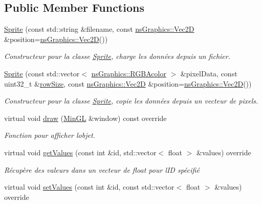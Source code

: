 \subsection*{Public Member Functions}
\begin{DoxyCompactItemize}
\item 
\hyperlink{classns_gui_1_1_sprite_a35558b08dfeb3e3a20be52da28e33c4c}{Sprite} (const std\+::string \&filename, const \hyperlink{classns_graphics_1_1_vec2_d}{ns\+Graphics\+::\+Vec2D} \&position=\hyperlink{classns_graphics_1_1_vec2_d}{ns\+Graphics\+::\+Vec2D}())
\begin{DoxyCompactList}\small\item\em Constructeur pour la classe \hyperlink{classns_gui_1_1_sprite}{Sprite}, charge les données depuis un fichier. \end{DoxyCompactList}\item 
\hyperlink{classns_gui_1_1_sprite_abee8e5a2740555d46f19af3d4b489453}{Sprite} (const std\+::vector$<$ \hyperlink{classns_graphics_1_1_r_g_b_acolor}{ns\+Graphics\+::\+R\+G\+B\+Acolor} $>$ \&pixel\+Data, const uint32\+\_\+t \&\hyperlink{sprite_8h_a410460a0a75462ae38c5c9daf5fb06ed}{row\+Size}, const \hyperlink{classns_graphics_1_1_vec2_d}{ns\+Graphics\+::\+Vec2D} \&position=\hyperlink{classns_graphics_1_1_vec2_d}{ns\+Graphics\+::\+Vec2D}())
\begin{DoxyCompactList}\small\item\em Constructeur pour la classe \hyperlink{classns_gui_1_1_sprite}{Sprite}, copie les données depuis un vecteur de pixels. \end{DoxyCompactList}\item 
virtual void \hyperlink{classns_gui_1_1_sprite_a15157c69a1d792080d2b41519659418c}{draw} (\hyperlink{class_min_g_l}{Min\+GL} \&window) const override
\begin{DoxyCompactList}\small\item\em Fonction pour afficher l\textquotesingle{}objet. \end{DoxyCompactList}\item 
virtual void \hyperlink{classns_gui_1_1_sprite_a19cd382e454660efd8a20ee30ba3cc8c}{get\+Values} (const int \&id, std\+::vector$<$ float $>$ \&values) override
\begin{DoxyCompactList}\small\item\em Récupère des valeurs dans un vecteur de float pour l\textquotesingle{}ID spécifié \end{DoxyCompactList}\item 
virtual void \hyperlink{classns_gui_1_1_sprite_a4259e3283228980136e06d2a41a75d31}{set\+Values} (const int \&id, const std\+::vector$<$ float $>$ \&values) override

\end{DoxyCompactItemize}
